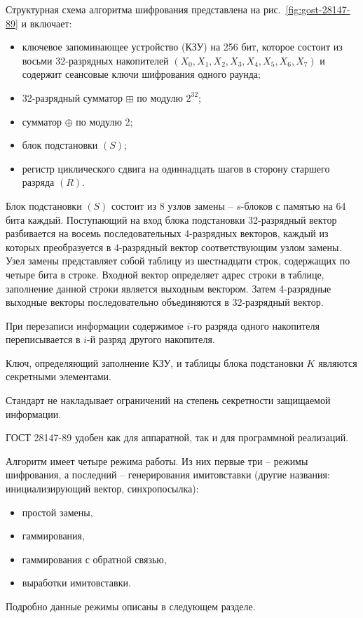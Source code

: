 Структурная схема алгоритма шифрования представлена на рис.~\ref{fig:gost-28147-89} и включает:
\begin{itemize}
    \item ключевое запоминающее устройство (КЗУ) на 256 бит, которое состоит из восьми 32-разрядных накопителей $(X_0, X_1, X_2, X_3, X_4, X_5, X_6, X_7)$ и содержит сеансовые ключи шифрования одного раунда;
    \item 32-разрядный сумматор $\boxplus$ по модулю $2^{32}$;
    \item сумматор $\oplus$ по модулю 2;
    \item блок подстановки $(S)$;
    \item регистр циклического сдвига на одиннадцать шагов в сторону старшего разряда $(R)$.
\end{itemize}

Блок подстановки $(S)$ состоит из 8 узлов замены -- $s$-блоков с памятью на 64 бита каждый. Поступающий на вход блока подстановки 32-разрядный вектор разбивается на восемь последовательных 4-разрядных векторов, каждый из которых преобразуется в 4-разрядный вектор соответствующим узлом замены. Узел замены представляет собой таблицу из шестнадцати строк, содержащих по четыре бита в строке. Входной вектор определяет адрес строки в таблице, заполнение данной строки является выходным вектором. Затем 4-разрядные выходные векторы последовательно объединяются в 32-разрядный вектор.

При перезаписи информации содержимое $i$-го разряда одного накопителя переписывается в $i$-й разряд другого накопителя.

Ключ, определяющий заполнение КЗУ, и таблицы блока подстановки $K$ являются секретными элементами.

Стандарт не накладывает ограничений на степень секретности защищаемой информации.

ГОСТ 28147-89 удобен как для аппаратной, так и для программной реализаций.

Алгоритм имеет четыре режима работы. Из них первые три -- режимы шифрования, а последний -- генерирования имитовставки (другие названия: инициализирующий вектор, синхропосылка):
\begin{itemize}
    \item простой замены,
    \item гаммирования,
    \item гаммирования с обратной связью,
    \item выработки имитовставки.
\end{itemize}


Подробно данные режимы описаны в следующем разделе.


